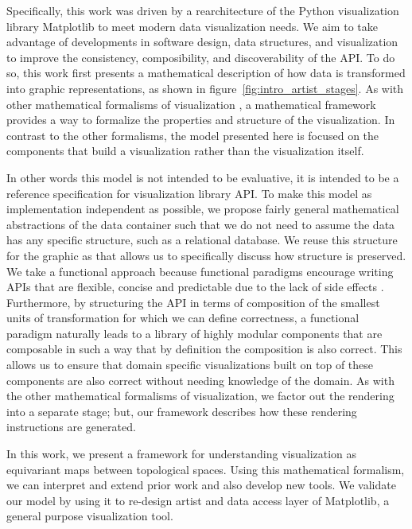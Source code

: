 Specifically, this work was driven by a rearchitecture of the Python visualization library Matplotlib\cite{hunterMatplotlib2DGraphics2007} to meet modern data visualization needs. We aim to take advantage of developments in software design, data structures, and visualization to improve the consistency, composibility, and discoverability of the API. To do so, this work first presents a mathematical description of how data is transformed into graphic representations, as shown in figure~\ref{fig:intro_artist_stages}. As with other mathematical formalisms of visualization \cite{mackinlayAutomatingDesignGraphical1986,kindlmann2014algebraic,sugibuchiFramwork2009,vickersUnderstandingViz2013}, a mathematical framework provides a way to formalize the properties and structure of the visualization. In contrast to the other formalisms, the model presented here is focused on the components that build a visualization rather than the visualization itself. 

In other words this model is not intended to be evaluative, it is intended to be a reference specification for visualization library API. To make this model as implementation independent as possible, we propose fairly general mathematical abstractions of the data container such that we do not need to assume the data has any specific structure, such as a relational database. We reuse this structure for the graphic as that allows us to specifically discuss how structure is preserved. We take a functional approach because functional paradigms encourage writing APIs that are flexible, concise and predictable due to the lack of side effects \cite{loudenProgrammingLanguagesPrinciples2010}. Furthermore, by structuring the API in terms of composition of the smallest units of transformation for which we can define correctness, a functional paradigm naturally leads to a library of highly modular components that are composable in such a way that by definition the composition is also correct. This allows us to ensure that domain specific visualizations built on top of these components are also correct without needing knowledge of the domain. As with the other mathematical formalisms of visualization, we factor out the rendering into a separate stage; but, our framework describes how these rendering instructions are generated. 

In this work, we present a framework for understanding visualization as equivariant maps between topological spaces. Using this mathematical formalism, we can interpret and extend prior work and also develop new tools. We validate our model by using it to re-design artist and data access layer of Matplotlib, a general purpose visualization tool.

